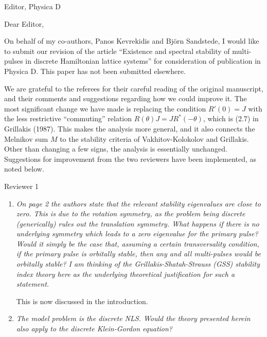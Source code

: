 \documentclass[11pt]{letter}
\begin{document}
\address{Ross Parker \\
Division of Applied Mathematics \\
Brown University \\
Providence, RI 02912 \\
\texttt{ross\_parker@brown.edu}}%
\signature{Ross Parker}
\begin{letter}{Editor, Physica D}

\opening{Dear Editor,}

On behalf of my co-authors, Panos Kevrekidis and Bj\"orn Sandstede, I would like to submit our revision of the article ``Existence and spectral stability of multi-pulses in discrete Hamiltonian lattice systems'' for consideration of publication in Physica D. This paper has not been submitted elsewhere.

We are grateful to the referees for their careful reading of the original manuscript, and their comments and suggestions regarding how we could improve it. The most significant change we have made is replacing the condition $R'(0) = J$ with the less restrictive ``commuting'' relation $R(\theta)J = J R^*(-\theta)$, which is (2.7) in Grillakis (1987). This makes the analysis more general, and it also connects the Melnikov sum $M$ to the stability criteria of Vakhitov-Kolokolov and Grillakis. Other than changing a few signs, the analysis is essentially unchanged. Suggestions for improvement from the two reviewers have been implemented, as noted below.

Reviewer 1
\begin{enumerate}
\item \emph{On page 2 the authors state that the relevant stability eigenvalues are close to zero. This is due to the rotation symmetry, as the problem being discrete (generically) rules out the translation symmetry. What happens if there is no underlying symmetry which leads to a zero eigenvalue for the primary pulse? Would it simply be the case that, assuming a certain transversality condition, if the primary pulse is orbitally stable, then any and all multi-pulses would be orbitally stable? I am thinking of the Grillakis-Shatah-Strauss (GSS) stability index theory here as the underlying theoretical justification for such a statement.}

\vspace{4mm}
This is now discussed in the introduction.
\vspace{4mm}

\item \emph{The model problem is the discrete NLS. Would the theory presented herein also apply to the discrete Klein-Gordon equation?}


\end{enumerate}
\end{letter}
\end{document}
